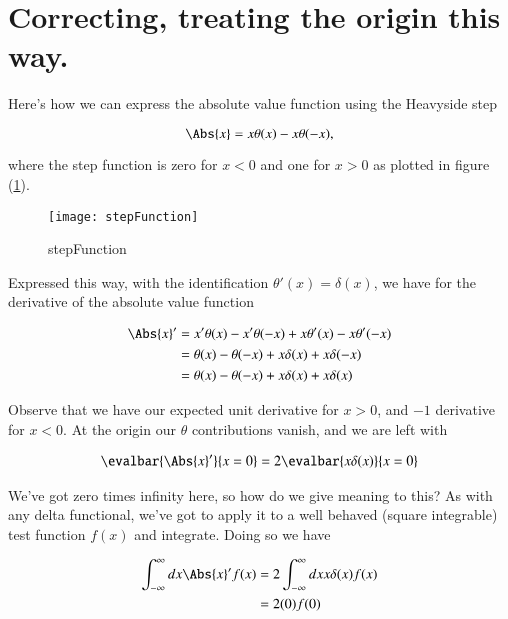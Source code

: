 \section{Correcting, treating the origin this way.}

Here's how we can express the absolute value function using the Heavyside step

\begin{equation}\label{eqn:variationHarmonicOscillator:330}
\Abs{x} = x \theta(x) - x \theta(-x),
\end{equation}

where the step function is zero for $x < 0$ and one for $x > 0$ as plotted in figure (\ref{fig:stepFunction}).

\begin{figure}[htp]
\centering
\texttt{[image: stepFunction]}
\caption{stepFunction}\label{fig:stepFunction}
\end{figure}

Expressed this way, with the identification $\theta'(x) = \delta(x)$, we have for the derivative of the absolute value function

\begin{align*}
\Abs{x}' 
&= x' \theta(x) - x' \theta(-x) + x \theta'(x) - x \theta'(-x) \\
&= \theta(x) - \theta(-x) + x \delta(x) + x \delta(-x) \\
&= \theta(x) - \theta(-x) + x \delta(x) + x \delta(x) \\
\end{align*}

Observe that we have our expected unit derivative for $x > 0$, and $-1$ derivative for $x < 0$.  At the origin our $\theta$ contributions vanish, and we are left with

\begin{align*}
\evalbar{\Abs{x}' }{x=0}
= 2 \evalbar{x \delta(x)}{x=0} \\
\end{align*}

We've got zero times infinity here, so how do we give meaning to this?  As with any delta functional, we've got to apply it to a well behaved (square integrable) test function $f(x)$ and integrate.  Doing so we have

\begin{align*}
\int_{-\infty}^\infty dx \Abs{x}' f(x) 
&= 2 \int_{-\infty}^\infty dx x \delta(x) f(x) \\
&= 2 (0) f(0)
\end{align*}

